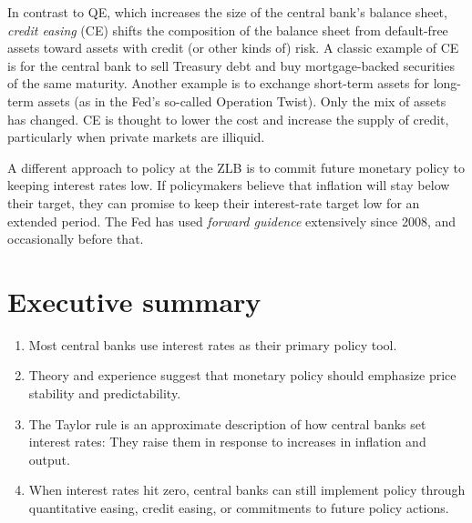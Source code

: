 In contrast to QE, which increases the size of the central bank's 
balance sheet, 
{\it credit easing\/} (CE) shifts the composition of the balance sheet
from default-free assets toward assets with credit (or other kinds of) risk.
A classic example of CE is for the central bank  to sell Treasury debt
and buy mortgage-backed securities of the same maturity. Another example
is to exchange short-term assets for long-term assets (as in the Fed's
so-called Operation Twist).
Only the mix of assets has changed.
CE is thought to lower the cost and increase the supply of credit,
particularly when private markets are illiquid.

A different approach to policy at the ZLB is to commit future monetary
policy to keeping interest rates low.
If policymakers believe that inflation will stay below their target,
they can promise to keep their interest-rate target low
for an extended period.
The Fed has used {\it   forward guidence\/}  
extensively since 2008, and occasionally before that.

\section*{Executive summary}

\begin{enumerate}
\item Most central banks use interest rates as their primary policy tool.

\item Theory and experience suggest that monetary policy
should emphasize price stability and predictability.

\item The Taylor rule is an approximate description of how
central banks set interest rates: They raise them in response to
increases in inflation and output.

\item When interest rates hit zero, central banks can still implement
policy through quantitative easing, credit easing, or
commitments to future policy actions.
\end{enumerate}


